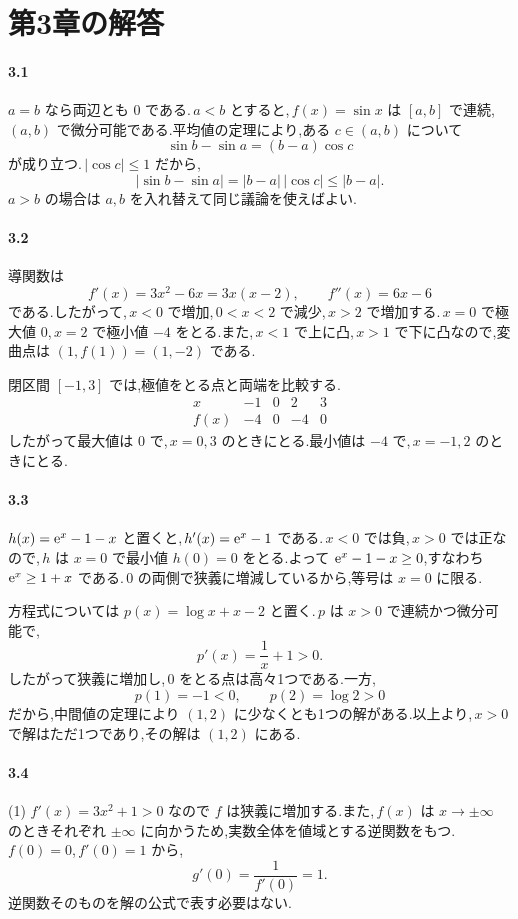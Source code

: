 \section{第3章の解答}\label{解答:第3章}
\paragraph{3.1}
$a=b$ なら両辺とも $0$ である.\,$a<b$ とすると,\,$f(x)=\sin x$ は $[a,b]$ で連続,\,$(a,b)$ で微分可能である.平均値の定理により,ある $c\in(a,b)$ について
\[
 \sin b-\sin a=(b-a)\cos c
\]
が成り立つ.\,$|\cos c|\le1$ だから,
\[
 |\sin b-\sin a|=|b-a|\,|\cos c|\le|b-a|.
\]
$a>b$ の場合は $a,b$ を入れ替えて同じ議論を使えばよい.

\paragraph{3.2}
導関数は
\[
 f'(x)=3x^2-6x=3x(x-2),\qquad f''(x)=6x-6
\]
である.したがって,\,$x<0$ で増加,\,$0<x<2$ で減少,\,$x>2$ で増加する.\,$x=0$ で極大値 $0$,\,$x=2$ で極小値 $-4$ をとる.また,\,$x<1$ で上に凸,\,$x>1$ で下に凸なので,変曲点は $(1,f(1))=(1,-2)$ である.

閉区間 $[-1,3]$ では,極値をとる点と両端を比較する.
\[
\begin{array}{c|rrrr}
 x&-1&0&2&3\\ \hline
 f(x)&-4&0&-4&0
\end{array}
\]
したがって最大値は $0$ で,\,$x=0,3$ のときにとる.最小値は $-4$ で,\,$x=-1,2$ のときにとる.

\paragraph{3.3}
$h(x)=\mathrm{e}^x-1-x$ と置くと,\,$h'(x)=\mathrm{e}^x-1$ である.\,$x<0$ では負,\,$x>0$ では正なので,\,$h$ は $x=0$ で最小値 $h(0)=0$ をとる.よって $\mathrm{e}^x-1-x\ge0$,すなわち $\mathrm{e}^x\ge1+x$ である.\,$0$ の両側で狭義に増減しているから,等号は $x=0$ に限る.

方程式については $p(x)=\log x+x-2$ と置く.\,$p$ は $x>0$ で連続かつ微分可能で,
\[
 p'(x)=\frac1x+1>0.
\]
したがって狭義に増加し,\,$0$ をとる点は高々1つである.一方,
\[
 p(1)=-1<0,\qquad p(2)=\log2>0
\]
だから,中間値の定理により $(1,2)$ に少なくとも1つの解がある.以上より,\,$x>0$ で解はただ1つであり,その解は $(1,2)$ にある.

\paragraph{3.4}
(1) $f'(x)=3x^2+1>0$ なので $f$ は狭義に増加する.また,\,$f(x)$ は $x\to\pm\infty$ のときそれぞれ $\pm\infty$ に向かうため,実数全体を値域とする逆関数をもつ.\,$f(0)=0$,\,$f'(0)=1$ から,
\[
 g'(0)=\frac1{f'(0)}=1.
\]
逆関数そのものを解の公式で表す必要はない.


